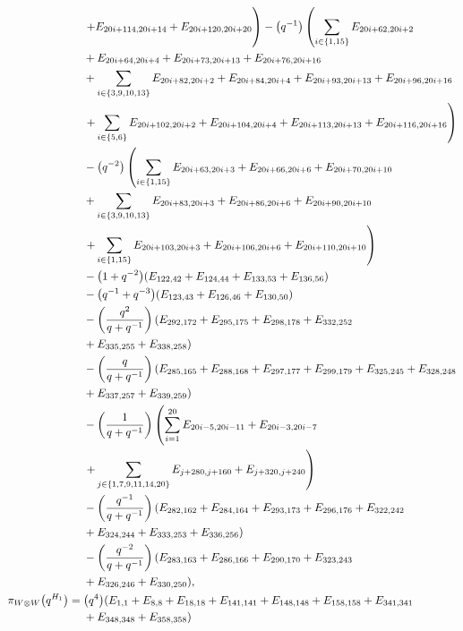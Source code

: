 \documentclass[pdftex]{sigma}
\numberwithin{equation}{section}
\theoremstyle{definition}
\begin{document}
\begin{align*}
&\left.+ E_{20i+114,20i+14}+ E_{20i+120,20i+20} \vphantom{\sum_{i \in \{5,6\}}}\right)-\bigl(q^{-1}\bigr)\left( \sum_{i \in \{1,15\}} E_{20i+62,20i+2}\right. \\
&+ E_{20i+64,20i+4} + E_{20i+73,20i+13} + E_{20i+76,20i+16} \\
&+ \sum_{i \in \{3,9,10,13\}} E_{20i+82,20i+2} + E_{20i+84,20i+4} + E_{20i+93,20i+13} + E_{20i+96,20i+16} \\
&\left. + \sum_{i \in \{5,6\}} E_{20i+102,20i+2} + E_{20i+104,20i+4} + E_{20i+113,20i+13} + E_{20i+116,20i+16} \right)\\
&-\bigl(q^{-2}\bigr)\left( \sum_{i \in \{1,15\}} E_{20i+63,20i+3} + E_{20i+66,20i+6} + E_{20i+70,20i+10}\right.\\
&+ \sum_{i \in \{3,9,10,13\}} E_{20i+83,20i+3} + E_{20i+86,20i+6} + E_{20i+90,20i+10} \\
&\left. + \sum_{i \in \{1,15\}} E_{20i+103,20i+3} + E_{20i+106,20i+6} + E_{20i+110,20i+10} \right)\\
&-\bigl(1 + q^{-2}\bigr)(E_{122,42}+E_{124,44}+E_{133,53}+E_{136,56})\\
&-\bigl(q^{-1} + q^{-3}\bigr)(E_{123,43}+E_{126,46}+E_{130,50})\\
&-\left(\frac{q^2}{q + q^{-1}}\right)(E_{292,172}+E_{295,175}+E_{298,178}+E_{332,252}\\
&+E_{335,255}+E_{338,258})\\
&-\left(\frac{q}{q + q^{-1}}\right)(E_{285,165}+E_{288,168}+E_{297,177}+E_{299,179}+E_{325,245}+E_{328,248}\\
&+E_{337,257}+E_{339,259})\\
&-\left(\frac{1}{q + q^{-1}}\right)\left( \sum_{i=1}^{20} E_{20i-5,20i-11} + E_{20i-3,20i-7} \vphantom{\sum_{j \in \{1,7,9,11,14,20\}}}\right.\\
&\left. + \sum_{j \in \{1,7,9,11,14,20\}} E_{j+280,j+160} + E_{j+320,j+240} \right) \\
&-\left(\frac{q^{-1}}{q + q^{-1}}\right)(E_{282,162}+E_{284,164}+E_{293,173}+E_{296,176}+E_{322,242}\\
&+E_{324,244}+E_{333,253}+E_{336,256})\\
&-\left(\frac{q^{-2}}{q + q^{-1}}\right)(E_{283,163}+E_{286,166}+E_{290,170}+E_{323,243}\\
&+E_{326,246}+E_{330,250}),
\\
 \pi_{W \otimes W}\bigl(q^{H_1}\bigr) ={}&
\bigl(q^4\bigr)(E_{1,1}+E_{8,8}+E_{18,18}+E_{141,141}+E_{148,148}+E_{158,158}+E_{341,341}\\
&+E_{348,348}+E_{358,358})\\

\end{align*}
\end{document}
